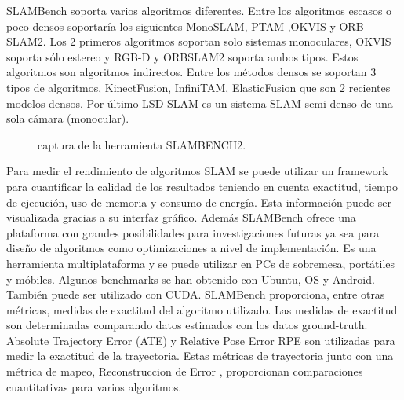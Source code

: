 \begin {enumerate}
SLAMBench soporta varios algoritmos diferentes. Entre los algoritmos escasos o poco densos soportaría los siguientes MonoSLAM, PTAM ,OKVIS y ORB-SLAM2. Los 2 primeros algoritmos soportan solo sistemas monoculares, OKVIS soporta sólo estereo y RGB-D y ORBSLAM2 soporta ambos tipos. Estos algoritmos son algoritmos indirectos.
Entre los métodos densos se soportan 3 tipos de algoritmos, KinectFusion, InfiniTAM, ElasticFusion que son 2 recientes modelos densos. Por último LSD-SLAM es un sistema SLAM semi-denso de una sola cámara (monocular).
\begin{figure}[H]
\begin{center}
\end{center}
\caption{captura de la herramienta SLAMBENCH2.}
\end{figure}

Para medir el rendimiento de algoritmos SLAM se puede utilizar un framework para cuantificar la calidad de los resultados teniendo en cuenta exactitud, tiempo de ejecución, uso de memoria y consumo de energía. Esta información puede ser visualizada gracias a su interfaz gráfico.
Además SLAMBench ofrece una plataforma con grandes posibilidades para investigaciones futuras ya sea para diseño de algoritmos como optimizaciones a nivel de implementación. Es una herramienta multiplataforma y se puede utilizar en PCs de sobremesa, portátiles y móbiles. Algunos benchmarks se han obtenido con Ubuntu, OS y Android.
También puede ser utilizado con CUDA.
SLAMBench proporciona, entre otras métricas, medidas de exactitud del algoritmo utilizado. Las medidas de exactitud son determinadas comparando datos estimados con los datos ground-truth.
Absolute Trajectory Error (ATE) y Relative Pose Error RPE son utilizadas para medir la exactitud de la trayectoria. Estas métricas de trayectoria junto con una métrica de mapeo, Reconstruccion de Error , proporcionan comparaciones cuantitativas para varios algoritmos.


\end{enumerate}
